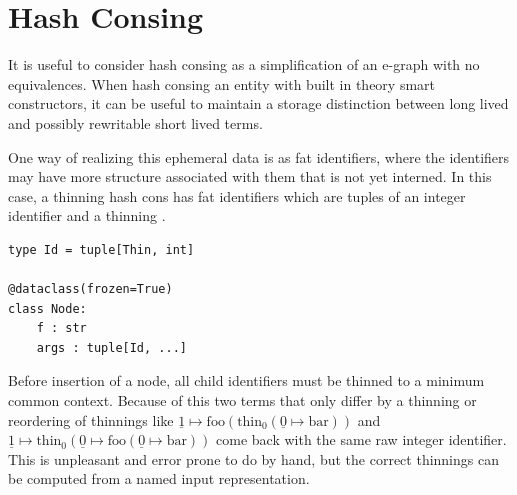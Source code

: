 \documentclass{article}%
\begin{document}


\section{Hash Consing}

It is useful to consider hash consing as a simplification of an e-graph with no equivalences. When hash consing an entity with built in theory smart constructors, it can be useful to maintain a storage distinction between long lived and possibly rewritable short lived terms. \cite{zucker2025omeletsneedonionsegraphs} 

One way of realizing this ephemeral data is as fat identifiers, where the identifiers may have more structure associated with them that is not yet interned. In this case, a thinning hash cons has fat identifiers which are tuples of an integer identifier and a thinning \cite{zucker2026alphaequival}. 

\begin{lstlisting}
type Id = tuple[Thin, int]

@dataclass(frozen=True)
class Node:
    f : str
    args : tuple[Id, ...]
\end{lstlisting}


Before insertion of a node, all child identifiers must be thinned to a minimum common context. Because of this two terms that only differ by a thinning or reordering of thinnings like $\underline{1} \mapsto \text{foo}(\text{thin}_0(\underline{0} \mapsto \text{bar}))$ and $\underline{1} \mapsto \text{thin}_0(\underline{0} \mapsto \text{foo}(\underline{0} \mapsto \text{bar}))$ come back with the same raw integer identifier. This is unpleasant and error prone to do by hand, but the correct thinnings can be computed from a named input representation.






\end{document}
